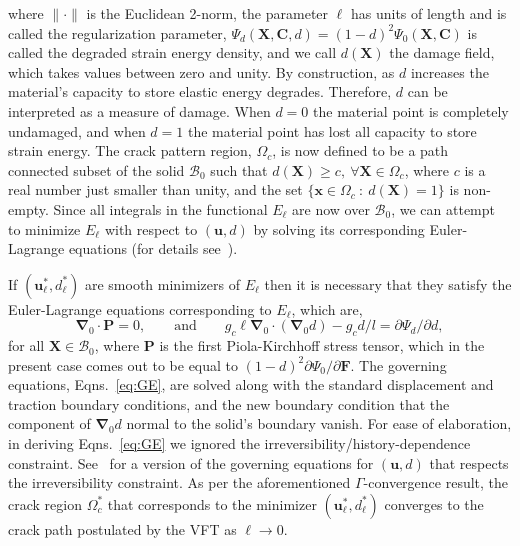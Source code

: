 \documentclass[10pt,letterpaper]{article}
\newcommand{\bs}[1]{\ensuremath{\boldsymbol{#1}}}
\begin{document}
\begin{mdframed}
                       where $\|\cdot\|$ is the Euclidean 2-norm, the parameter $\ell$ has units of length and is called the regularization parameter, $\Psi_{d}(\mathbf{X},\bs{C}, d)=(1-d)^2 \Psi_{0}(\bs{X}, \bs{C})$ is called the degraded strain energy density, and we call $d(\bs{X})$ the damage field, which takes values between zero and unity. By construction, as $d$ increases the material's capacity to store elastic energy degrades. Therefore, $d$ can be interpreted as a measure of damage. When $d=0$ the material point is completely undamaged, and when $d=1$ the material point has lost all capacity to store strain energy. The crack pattern region, $\Omega_c$, is now defined to be a path connected subset of the solid $\mathcal{B}_0$ such that $d(\bs{X})\ge c,~\forall\bs{X}\in \Omega_c$, where $c$ is a real number just smaller than unity, and the set $\{\bs{x}\in \Omega_c~:~d(\bs{X})=1\}$ is non-empty. Since all integrals in the functional $E_{\ell}$ are now over $\mathcal{B}_0$, we can attempt to minimize $E_{\ell}$ with respect to $(\bs{u},d)$ by solving its corresponding Euler-Lagrange equations (for details see~\cite{borden2012phase}).

                       If $(\bs{u}^*_{\ell},d^*_{\ell})$ are smooth minimizers of $E_{\ell}$ then it is necessary that they satisfy the Euler-Lagrange equations corresponding to $E_{\ell}$, which are,
                       \begin{equation}
                         \label{eq:GE}
                       \bs{\nabla}_0\cdot\bs{P}=0,
                       \qquad\text{and}\qquad
                       g_c\ell\bs{\nabla}_0 \cdot (\bs{\nabla}_0 d)-g_c d/l=\partial \Psi_d/\partial d,
                       \end{equation}
                       for all $\bs{X}\in \mathcal{B}_0$, where $\bs{P}$ is the first Piola-Kirchhoff stress tensor, which in the present case comes out to be equal to $(1-d)^2\partial \Psi_0/\partial \bs{F}$. The governing equations, Eqns.~\eqref{eq:GE}, are solved along with the standard displacement and traction boundary conditions, and the new boundary condition that the component of $\bs{\nabla}_0 d$ normal to the solid's boundary vanish. For ease of elaboration, in deriving Eqns.~\eqref{eq:GE}  we ignored the irreversibility/history-dependence constraint. See~\cite{miehe2010phase} for a version of the governing equations for $(\bs{u},d)$ that respects the irreversibility constraint.
                       As per the aforementioned $\mathit{\Gamma}$-convergence result, the crack region $\Omega_c^*$ that corresponds to the minimizer $(\bs{u}^*_{\ell},d^*_{\ell})$ converges to the crack path postulated by the VFT as $\ell \to 0$.
                    \end{mdframed}
\end{document}
